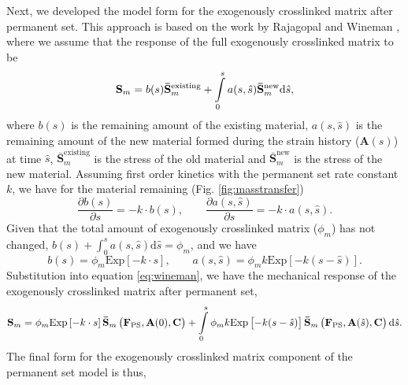 	Next, we developed the model form for the exogenously crosslinked matrix after permanent set. This approach is based on the work by Rajagopal and Wineman \cite{rajagopal_constitutive_1992}, where we assume that the response of the full exogenously crosslinked matrix to be 
\begin{equation} \label{eq:wineman}
\mathbf{S}_m = b(s)\mathbf{\bar{S}}_m^\mathrm{existing} + \int\displaylimits_0^s a(s,\hat{s})\mathbf{\bar{S}}_m^\mathrm{new} \mathrm{d}\hat{s},
\end{equation}
where $b(s)$ is the remaining amount of the existing material, $a(s,\hat{s})$ is the remaining amount of the new material formed during the strain history ($\mathbf{A}(s)$) at time $\hat{s}$, $\mathbf{\bar{S}}_m^\mathrm{existing}$ is the stress of the old material and $\mathbf{\bar{S}}_m^\mathrm{new}$ is the stress of the new material. Assuming first order kinetics with the permanent set rate constant $k $, we have for the material remaining (Fig. \ref{fig:masstransfer})
\begin{equation}
\frac{\partial b(s)}{\partial s} = - k\cdot b(s), \qquad \frac{\partial a(s,\hat{s})}{\partial s} = - k \cdot a(s,\hat{s}).
\end{equation}
Given that the total amount of exogenously crosslinked matrix ($\phi_m$) has not changed, $b(s) + \int_0^s a(s, \hat{s}) \mathrm{d}\hat{s} = \phi_m$, and we have
\begin{equation}
b(s) = \phi_m \mathrm{Exp}\left[-k  \cdot s\right], \qquad a(s,\hat{s}) = \phi_m k  \mathrm{Exp}\left[-k (s - \hat{s})\right].
\end{equation}
Substitution into equation \ref{eq:wineman}, we have the mechanical response of the exogenously crosslinked matrix after permanent set,
\begin{equation}
\mathbf{S}_m = \phi_m \mathrm{Exp}\left[-k  \cdot s\right]\mathbf{\bar{S}}_m \left(\mathbf{F}_\mathrm{PS},\mathbf{A}(0),\mathbf{C}\right) + \int\displaylimits_0^s \phi_m k  \mathrm{Exp}\left[-k (s - \hat{s})\right] \mathbf{\bar{S}}_m \left(\mathbf{F}_\mathrm{PS},  \mathbf{A}(\hat{s}),\mathbf{C}\right) \mathrm{d}\hat{s}.
\end{equation}
The final form for the exogenously crosslinked matrix component of the permanent set model is thus,

